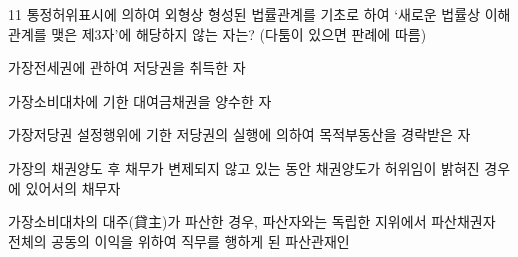 \begin{question}{11}
통정허위표시에 의하여 외형상 형성된 법률관계를 기초로 하여 ‘새로운 법률상 이해관계를 맺은 제3자’에 해당하지 않는 자는? (다툼이 있으면 판례에 따름)
\begin{choices}
  \item 가장전세권에 관하여 저당권을 취득한 자
  \item 가장소비대차에 기한 대여금채권을 양수한 자
  \item 가장저당권 설정행위에 기한 저당권의 실행에 의하여 목적부동산을 경락받은 자
  \item 가장의 채권양도 후 채무가 변제되지 않고 있는 동안 채권양도가 허위임이 밝혀진 경우에 있어서의 채무자
  \item 가장소비대차의 대주(貸主)가 파산한 경우, 파산자와는 독립한 지위에서 파산채권자 전체의 공동의 이익을 위하여 직무를 행하게 된 파산관재인
\end{choices}
\end{question}
